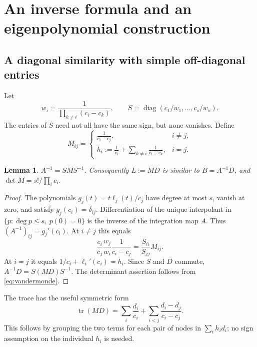 \documentclass[11pt]{article}
\newtheorem{lemma}[theorem]{Lemma}
\theoremstyle{remark}
\DeclareMathOperator{\diag}{diag}
\DeclareMathOperator{\tr}{tr}
\begin{document}
\section{An inverse formula and an eigenpolynomial construction}
\subsection{A diagonal similarity with simple off-diagonal entries}
Let
\[
 w_i=\frac{1}{\prod_{k\ne i}(c_i-c_k)},\qquad
 S=\diag(c_1/w_1,\ldots,c_s/w_s).
\]
The entries of $S$ need not all have the same sign, but none vanishes.
Define
\begin{equation}\label{eq:M}
 M_{ij}=\begin{cases}
 \displaystyle\frac{1}{c_i-c_j},&i\ne j,\\[6pt]
 \displaystyle h_i:=\frac1{c_i}+\sum_{k\ne i}\frac1{c_i-c_k},&i=j.
 \end{cases}
\end{equation}
\begin{lemma}\label{lem:inverse}
$A^{-1}=SMS^{-1}$. Consequently $L:=MD$ is similar to $B=A^{-1}D$,
and $\det M=s!/\prod_i c_i$.
\end{lemma}
\begin{proof}
The polynomials $g_j(t)=t\ell_j(t)/c_j$ have degree at most $s$, vanish at zero,
and satisfy $g_j(c_i)=\delta_{ij}$. Differentiation of the unique interpolant in
$\{p:\deg p\leq s,\ p(0)=0\}$ is the inverse of the integration map $A$.
Thus $(A^{-1})_{ij}=g_j'(c_i)$. At $i\ne j$ this equals
\[
 \frac{c_i}{c_j}\frac{w_j}{w_i}\frac1{c_i-c_j}
 =\frac{S_{ii}}{S_{jj}}M_{ij}.
\]
At $i=j$ it equals $1/c_i+\ell_i'(c_i)=h_i$. Since $S$ and $D$ commute,
$A^{-1}D=S(MD)S^{-1}$. The determinant assertion follows from
\eqref{eq:vandermonde}.
\end{proof}
The trace has the useful symmetric form
\begin{equation}\label{eq:tracepair}
 \tr(MD)=\sum_i\frac{d_i}{c_i}
       +\sum_{i<j}\frac{d_i-d_j}{c_i-c_j}.
\end{equation}
This follows by grouping the two terms for each pair of nodes in
$\sum_i h_i d_i$; no sign assumption on the individual $h_i$ is needed.
\end{document}
